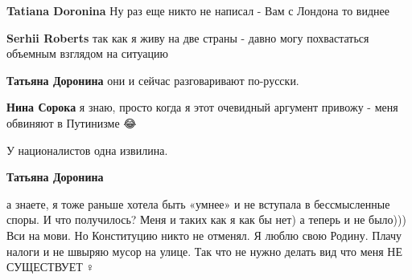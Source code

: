 \begin{itemize}
\begin{itemize}
\textbf{Tatiana Doronina} Ну раз еще никто не написал - Вам с Лондона то виднее 🤣

 
\textbf{Serhii Roberts} так как я живу на две страны - давно могу похвастаться объемным взглядом на ситуацию

 
\textbf{Татьяна Доронина} они и сейчас разговаривают по-русски.

 
\textbf{Нина Сорока} я знаю, просто когда я этот очевидный аргумент привожу - меня обвиняют в Путинизме 😂

 
У националистов одна извилина.

 
\textbf{Татьяна Доронина} 

а знаете, я тоже раньше хотела быть «умнее» и не вступала в бессмысленные
споры. И что получилось? Меня и таких как я как бы нет) а теперь и не было)))
Вси на мови. Но Конституцию никто не отменял. Я люблю свою Родину. Плачу налоги
и не швыряю мусор на улице. Так что не нужно делать вид что меня НЕ
СУЩЕСТВУЕТ🙆♀️


 

\end{itemize}
\end{itemize}
